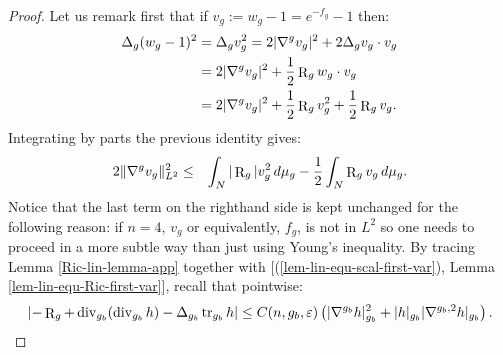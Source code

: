 \documentclass[a4paper,11pt,reqno]{amsart}
\def\tr{\mathop{\rm tr}\nolimits}
\def\div{\mathop{\rm div}\nolimits}
\def\tr{\mathop{\rm tr}\nolimits}
\def\div{\mathop{\rm div}\nolimits}
\def\R{\mathop{\rm R}\nolimits}
\numberwithin{equation}{section}
\begin{document}
	\begin{proof}
		Let us remark first that if $v_g:=w_g-1=e^{-f_g}-1$ then:
		\begin{equation*}
		\begin{split}
		\Delta_g(w_g-1)^2&=\Delta_gv_g^2=2|\nabla^gv_g|^2+2\Delta_gv_g\cdot v_g\\
		&=2|\nabla^gv_g|^2+\frac{1}{2}\R_gw_g\cdot v_g\\
		&=2|\nabla^gv_g|^2+\frac{1}{2}\R_gv_g^2+\frac{1}{2}\R_gv_g.
		\end{split}
		\end{equation*}
		Integrating by parts the previous identity gives:
		\begin{eqnarray}
		2\|\nabla^gv_g\|^2_{L^2}&\leq&\int_N|\R_g|v_g^2\,d\mu_g-\frac{1}{2}\int_N\R_gv_g\,d\mu_g.\label{first-int-est-nabla-v}
		\end{eqnarray}
		Notice that the last term on the righthand side is kept unchanged for the following reason: if $n=4$, $v_g$ or equivalently, $f_g$, is not in $L^2$ so one needs to proceed in a more subtle way than just using Young's inequality. By tracing Lemma \ref{Ric-lin-lemma-app} together with [(\ref{lem-lin-equ-scal-first-var}), Lemma \ref{lem-lin-equ-Ric-first-var}], recall that pointwise:
		\begin{equation*}
		\left|-\R_g+\div_{g_b}(\div_{g_b}h)-\Delta_{g_b}\tr_{g_b}h\right|\leq C(n,g_b,\varepsilon)\left(|\nabla^{g_b}h|_{g_b}^2+|h|_{g_b}|\nabla^{g_b,2}h|_{g_b}\right).
		\end{equation*}
		

\end{proof}
\end{document}
